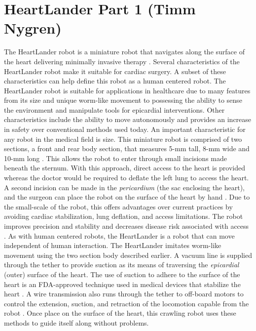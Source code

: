 \documentclass[11pt,conference]{IEEEtran}
\begin{document}
\section{ HeartLander Part 1 (Timm Nygren)}

\indent The HeartLander robot is a miniature robot that navigates along the surface of the heart delivering minimally invasive therapy \cite{overview}. Several characteristics of the HeartLander robot make it suitable for cardiac surgery. A subset of these characteristics can help define this robot as a human centered robot. The HeartLander robot is suitable for applications in healthcare due to many features from its size and unique worm-like movement to possessing the ability to sense the environment and manipulate tools for epicardial interventions. Other characteristics include the ability to move autonomously and provides an increase in safety over conventional methods used today.
\newline
\indent An important characteristic for any robot in the medical field is size. This  miniature robot is comprised of two sections, a front and rear body section, that measures 5-mm tall, 8-mm wide and 10-mm long \cite{design}. This allows the robot to enter through small incisions made beneath the sternum. With this approach, direct access to the heart is provided whereas the doctor would be required to deflate the left lung to access the heart. A second incision can be made in the \textit{pericardium} (the sac enclosing the heart), and the surgeon can place the robot on the surface of the heart by hand \cite{design}. Due to the small-scale of the robot, this offers advantages over current practices by avoiding cardiac stabilization, lung deflation, and access limitations. The robot improves precision and stability and decreases disease risk associated with access \cite{mellon}.
\newline
\indent As with human centered robots, the HeartLander is a robot that can move independent of human interaction. The HeartLander imitates worm-like movement using the two section body described earlier. A vacuum line is supplied through the tether to provide suction as its means of traversing the \textit{epicardial} (outer) surface of the heart. The use of suction to adhere to the surface of the heart is an FDA-approved technique used in medical devices that stabilize the heart \cite{design}. A wire transmission also runs through the tether to off-board motors to control the extension, suction, and retraction of the locomotion capable from the robot \cite{design}. Once place on the surface of the heart, this crawling robot uses these methods to guide itself along without problems.
\end{document}
